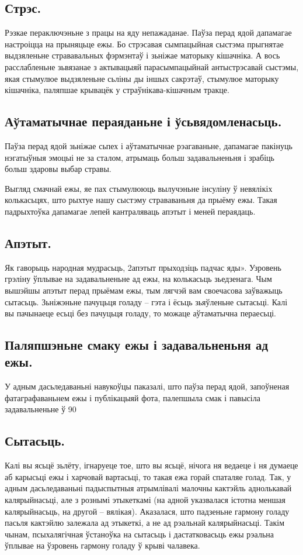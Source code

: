 \subsection{Стрэс.}
Рэзкае пераключэньне з працы на яду непажаданае. Паўза перад ядой дапамагае настроіцца на прыняцьце ежы. Бо стрэсавая сымпацыйная сыстэма прыгнятае выдзяленьне стрававальных фэрмэнтаў і зьніжае маторыку кішачніка. А вось расслабленьне зьвязанае з актывацыяй парасымпацыйнай антыстрэсавай сыстэмы, якая стымулюе выдзяленьне сьліны ды іншых сакрэтаў, стымулюе маторыку кішачніка, паляпшае крывацёк у страўнікава-кішачным тракце.

\subsection{Аўтаматычнае пераяданьне і ўсьвядомленасьць.}
Паўза перад ядой зьніжае сьпех і аўтаматычнае рэагаваньне, дапамагае пакінуць нэгатыўныя эмоцыі не за сталом, атрымаць больш задавальненьня і зрабіць больш здаровы выбар стравы.

Выгляд смачнай ежы, яе пах стымулююць вылучэньне інсуліну ў невялікіх колькасьцях, што рыхтуе нашу сыстэму страваваньня да прыёму ежы. Такая падрыхтоўка дапамагае лепей кантраляваць апэтыт і меней пераядаць.

\subsection{Апэтыт.}
Як гаворыць народная мудрасьць, 2апэтыт прыходзіць падчас яды». Узровень грэліну ўплывае на задавальненьне ад ежы, на колькасьць зьедзенага. Чым вышэйшы апэтыт перад прыёмам ежы, тым лягчэй вам своечасова заўважыць сытасьць. Зьніжэньне пачуцьця голаду – гэта і ёсьць зьяўленьне сытасьці. Калі вы пачынаеце есьці без пачуцьця голаду, то можаце аўтаматычна пераесьці.

\subsection{Паляпшэньне смаку ежы і задавальненьня ад ежы.}
У адным дасьледаваньні навукоўцы паказалі, што паўза перад ядой, запоўненая фатаграфаваньнем ежы і публікацыяй фота, палепшыла смак і павысіла задавальненьне ў 90%

\subsection{Сытасьць.}
Калі вы ясьцё зьлёту, ігнаруеце тое, што вы ясьцё, нічога ня ведаеце і ня думаеце аб карысьці ежы і харчовай вартасьці, то такая ежа горай спаталяе голад. Так, у адным дасьледаваньні падыспытныя атрымлівалі малочны кактэйль аднолькавай калярыйнасьці, але з рознымі этыкеткамі (на адной указвалася істотна меншая калярыйнасьць, на другой – вялікая). Аказалася, што падзеньне гармону голаду пасьля кактэйлю залежала ад этыкеткі, а не ад рэальнай калярыйнасьці. Такім чынам, псыхалягічная ўстаноўка на сытасьць і дастатковасьць ежы рэальна ўплывае на ўзровень гармону голаду ў крыві чалавека.

